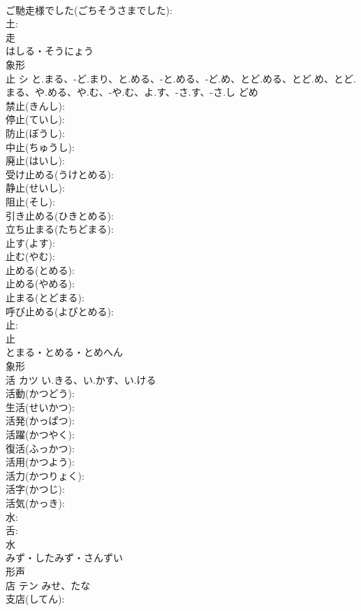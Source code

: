 \documentclass[8pt]{extreport}
\begin{document}
\begin{CJK}{UTF8}{min}
\\	ご馳走様でした(ごちそうさまでした): 
\\	土: 
\\	走	
\\	はしる・そうにょう	
\\	象形 
\\	止	シ	と.まる、-ど.まり、と.める、-と.める、-ど.め、とど.める、とど.め、とど.まる、や.める、や.む、-や.む、よ.す、-さ.す、-さ.し	どめ	
\\	禁止(きんし): 
\\	停止(ていし): 
\\	防止(ぼうし): 
\\	中止(ちゅうし): 
\\	廃止(はいし): 
\\	受け止める(うけとめる): 
\\	静止(せいし): 
\\	阻止(そし): 
\\	引き止める(ひきとめる): 
\\	立ち止まる(たちどまる): 
\\	止す(よす): 
\\	止む(やむ): 
\\	止める(とめる): 
\\	止める(やめる): 
\\	止まる(とどまる): 
\\	呼び止める(よびとめる): 
\\	止: 
\\	止	
\\	とまる・とめる・とめへん	
\\	象形 
\\	活	カツ	い.きる、い.かす、い.ける		
\\	活動(かつどう): 
\\	生活(せいかつ): 
\\	活発(かっぱつ): 
\\	活躍(かつやく): 
\\	復活(ふっかつ): 
\\	活用(かつよう): 
\\	活力(かつりょく): 
\\	活字(かつじ): 
\\	活気(かっき): 
\\	水: 
\\	舌: 
\\	水	
\\	みず・したみず・さんずい	
\\	形声 
\\	店	テン	みせ、たな		
\\	支店(してん): 

\end{CJK}
\end{document}
